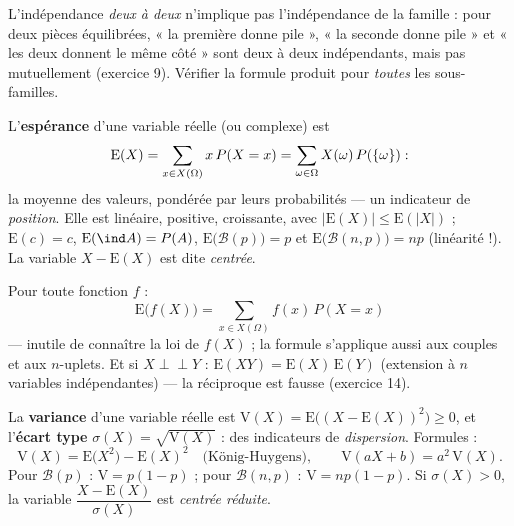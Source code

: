 \begin{attention}
L'indépendance \emph{deux à deux} n'implique pas l'indépendance de la
famille : pour deux pièces équilibrées, « la première donne pile », « la
seconde donne pile » et « les deux donnent le même côté » sont deux à deux
indépendants, mais pas mutuellement (exercice 9). Vérifier la formule
produit pour \emph{toutes} les sous-familles.
\end{attention}


\begin{theoreme}
L'\textbf{espérance} d'une variable réelle (ou complexe) est
\[
\mathrm{E}(X)=\sum_{x\in X(\Omega)}x\,P(X=x)
=\sum_{\omega\in\Omega}X(\omega)\,P(\left\{\omega\right\}) :
\]
la moyenne des valeurs, pondérée par leurs probabilités — un indicateur de
\emph{position}. Elle est linéaire, positive, croissante, avec
$|\mathrm{E}(X)|\leqslant\mathrm{E}(|X|)$ ; $\mathrm{E}(c)=c$,
$\mathrm{E}(\ind A)=P(A)$,
$\mathrm{E}\bigl(\mathcal{B}(p)\bigr)=p$ et
$\mathrm{E}\bigl(\mathcal{B}(n,p)\bigr)=np$ (linéarité !). La variable
$X-\mathrm{E}(X)$ est dite \emph{centrée}.
\end{theoreme}

\begin{theoreme}
Pour toute fonction $f$ :
\[
\mathrm{E}\bigl(f(X)\bigr)=\sum_{x\in X(\Omega)}f(x)\,P(X=x)
\]
— inutile de connaître la loi de $f(X)$ ; la formule s'applique aussi aux
couples et aux $n$-uplets. Et si $X\perp\!\!\!\perp Y$ :
$\mathrm{E}(XY)=\mathrm{E}(X)\,\mathrm{E}(Y)$ (extension à $n$ variables
indépendantes) — la réciproque est fausse (exercice 14).
\end{theoreme}


\begin{definition}[Dispersion]
La \textbf{variance} d'une variable réelle est
$\mathrm{V}(X)=\mathrm{E}\bigl((X-\mathrm{E}(X))^{2}\bigr)\geqslant0$, et
l'\textbf{écart type} $\sigma(X)=\sqrt{\mathrm{V}(X)}$ : des indicateurs
de \emph{dispersion}. Formules :
\[
\mathrm{V}(X)=\mathrm{E}\bigl(X^{2}\bigr)-\mathrm{E}(X)^{2}
\quad\text{(König-Huygens)},\qquad
\mathrm{V}(aX+b)=a^{2}\,\mathrm{V}(X) .
\]
Pour $\mathcal{B}(p)$ : $\mathrm{V}=p(1-p)$ ; pour $\mathcal{B}(n,p)$ :
$\mathrm{V}=np(1-p)$. Si $\sigma(X)>0$, la variable
$\dfrac{X-\mathrm{E}(X)}{\sigma(X)}$ est \emph{centrée réduite}.
\end{definition}

